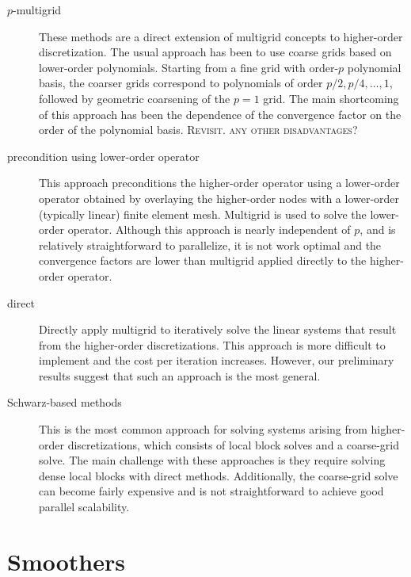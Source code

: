 \documentclass[times]{nlaauth}
\begin{document}
\begin{description}

 \item[$p$-multigrid] These methods are a direct extension of
	multigrid concepts to higher-order discretization. The usual
	approach has been to use coarse grids based on lower-order
	polynomials. Starting from a fine grid with order-$p$ polynomial
	basis, the coarser grids correspond to polynomials of order $p/2,
	p/4,\ldots,1$, followed by geometric coarsening of the $p=1$
	grid. The main shortcoming of this approach has been the dependence
	of the convergence factor on the order of the polynomial
	basis. \textsc{Revisit. any other disadvantages}?

\item[precondition using lower-order operator] This
	approach preconditions the higher-order operator using a lower-order
	operator obtained by overlaying the higher-order nodes with a
	lower-order (typically linear) finite element mesh. Multigrid is
	used to solve the lower-order operator. Although this approach is
	nearly independent of $p$, and is relatively straightforward to
	parallelize, it is not work optimal and the convergence factors are
	lower than multigrid applied directly to the higher-order
	operator.  

\item[direct] Directly apply multigrid to iteratively
	solve the linear systems that result from the higher-order
	discretizations. This approach is more difficult to implement and
	the cost per iteration increases. However, our preliminary results
	suggest that such an approach is the most general.

\item[Schwarz-based methods] This is the most common approach for
	solving systems arising from higher-order discretizations, which
	consists of local block solves and a coarse-grid solve. The main
	challenge with these approaches is they require solving dense local
	blocks with direct methods. Additionally, the coarse-grid solve can
	become fairly expensive and is not straightforward to achieve good
	parallel scalability. 


\end{description} 


\section{Smoothers}
\end{document}
